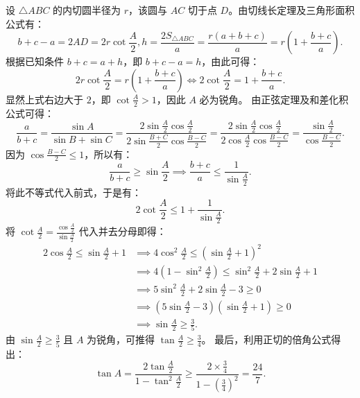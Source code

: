 \documentclass[lang=cn,11pt]{elegantbook}
\begin{document}
\begin{solution}
设 $\triangle ABC$ 的内切圆半径为 $r$，该圆与 $AC$ 切于点 $D$。由切线长定理及三角形面积公式有：
\[b+c-a = 2AD = 2r\cot\frac{A}{2}, h = \frac{2S_{\triangle ABC}}{a} = \frac{r(a+b+c)}{a} = r\left( 1+\frac{b+c}{a} \right).\]
根据已知条件 $b+c=a+h$，即 $b+c-a=h$，由此可得：
\[ 2r\cot\frac{A}{2} = r\left( 1+\frac{b+c}{a} \right) \iff 2\cot\frac{A}{2} = 1+\frac{b+c}{a}. \]
显然上式右边大于 $2$，即 $\cot\frac{A}{2} > 1$，因此 $A$ 必为锐角。
由正弦定理及和差化积公式可得：
\[ \frac{a}{b+c} = \frac{\sin A}{\sin B + \sin C} = \frac{2\sin\frac{A}{2}\cos\frac{A}{2}}{2\sin\frac{B+C}{2}\cos\frac{B-C}{2}} = \frac{2\sin\frac{A}{2}\cos\frac{A}{2}}{2\cos\frac{A}{2}\cos\frac{B-C}{2}} = \frac{\sin\frac{A}{2}}{\cos\frac{B-C}{2}}. \]
因为 $\cos\frac{B-C}{2} \le 1$，所以有：
\[ \frac{a}{b+c} \ge \sin\frac{A}{2} \implies \frac{b+c}{a} \le \frac{1}{\sin\frac{A}{2}}. \]
将此不等式代入前式，于是有：
\[ 2\cot\frac{A}{2} \le 1+\frac{1}{\sin\frac{A}{2}}. \]
将 $\cot\frac{A}{2} = \frac{\cos\frac{A}{2}}{\sin\frac{A}{2}}$ 代入并去分母即得：
\begin{align*}
2\cos\frac{A}{2} \le \sin\frac{A}{2}+1 &\implies 4\cos^2\frac{A}{2} \le (\sin\frac{A}{2}+1)^2 \\
&\implies 4(1-\sin^2\frac{A}{2}) \le \sin^2\frac{A}{2} + 2\sin\frac{A}{2} + 1 \\
&\implies 5\sin^2\frac{A}{2} + 2\sin\frac{A}{2} - 3 \ge 0 \\
&\implies (5\sin\frac{A}{2}-3)(\sin\frac{A}{2}+1) \ge 0 \\
&\implies \sin\frac{A}{2} \ge \frac{3}{5}.
\end{align*}
由 $\sin\frac{A}{2} \ge \frac{3}{5}$ 且 $A$ 为锐角，可推得 $\tan\frac{A}{2} \ge \frac{3}{4}$。
最后，利用正切的倍角公式得出：
\[ \tan A = \frac{2\tan\frac{A}{2}}{1-\tan^2\frac{A}{2}} \ge \frac{2 \times \frac{3}{4}}{1-\left(\frac{3}{4}\right)^2} = \frac{24}{7}. \]
\end{solution}
\end{document}
